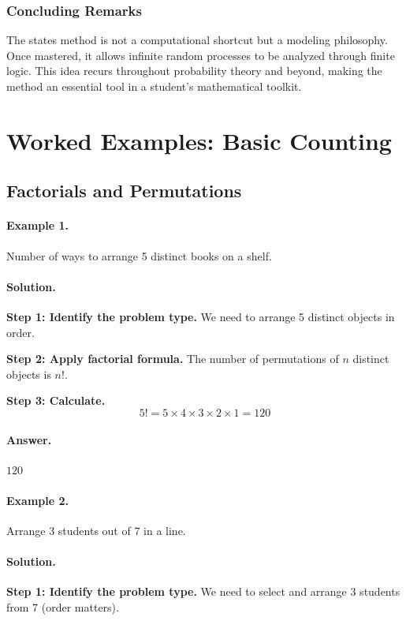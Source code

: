 \documentclass[12pt]{extarticle}
\begin{document}
\subsubsection*{Concluding Remarks}

The states method is not a computational shortcut but a modeling philosophy. Once mastered, it allows infinite random processes to be analyzed through finite logic. This idea recurs throughout probability theory and beyond, making the method an essential tool in a student's mathematical toolkit.

\newpage
\section{Worked Examples: Basic Counting}

\subsection{Factorials and Permutations}

\paragraph{Example 1.} Number of ways to arrange 5 distinct books on a shelf.

\paragraph{Solution.}
\textbf{Step 1: Identify the problem type.} We need to arrange 5 distinct objects in order.

\textbf{Step 2: Apply factorial formula.} The number of permutations of $n$ distinct objects is $n!$.

\textbf{Step 3: Calculate.}
\[
5! = 5 \times 4 \times 3 \times 2 \times 1 = 120
\]

\paragraph{Answer.} $\boxed{120}$

\paragraph{Example 2.} Arrange 3 students out of 7 in a line.

\paragraph{Solution.}
\textbf{Step 1: Identify the problem type.} We need to select and arrange 3 students from 7 (order matters).
\end{document}
